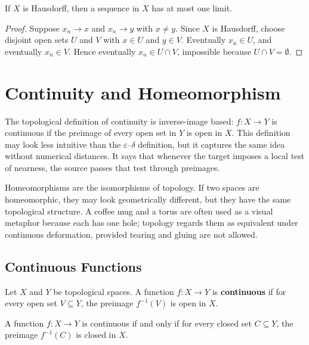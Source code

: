 \begin{theorem}
If $X$ is Hausdorff, then a sequence in $X$ has at most one limit.
\end{theorem}

\begin{proof}
Suppose $x_n\to x$ and $x_n\to y$ with $x\neq y$. Since $X$ is Hausdorff, choose disjoint open sets $U$ and $V$ with $x\in U$ and $y\in V$. Eventually $x_n\in U$, and eventually $x_n\in V$. Hence eventually $x_n\in U\cap V$, impossible because $U\cap V=\emptyset$.
\end{proof}

\section{Continuity and Homeomorphism}


The topological definition of continuity is inverse-image based: $f:X\to Y$ is continuous if the preimage of every open set in $Y$ is open in $X$. This definition may look less intuitive than the $\varepsilon$--$\delta$ definition, but it captures the same idea without numerical distances. It says that whenever the target imposes a local test of nearness, the source passes that test through preimages.

Homeomorphisms are the isomorphisms of topology. If two spaces are homeomorphic, they may look geometrically different, but they have the same topological structure. A coffee mug and a torus are often used as a visual metaphor because each has one hole; topology regards them as equivalent under continuous deformation, provided tearing and gluing are not allowed.

\subsection{Continuous Functions}

\begin{definition}[Continuity]
Let $X$ and $Y$ be topological spaces. A function $f:X\to Y$ is \textbf{continuous} if for every open set $V\subseteq Y$, the preimage $f^{-1}(V)$ is open in $X$.
\end{definition}

\begin{proposition}
A function $f:X\to Y$ is continuous if and only if for every closed set $C\subseteq Y$, the preimage $f^{-1}(C)$ is closed in $X$.
\end{proposition}

